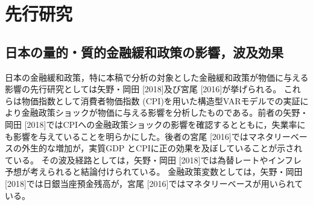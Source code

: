 \documentclass[12pt]{jarticle}
\begin{document}
{%






\section{先行研究}

\subsection{日本の量的・質的金融緩和政策の影響，波及効果}

日本の金融緩和政策，特に本稿で分析の対象とした金融緩和政策が物価に与える影響の先行研究としては矢野・岡田 [2018]及び宮尾 [2016]が挙げられる。
これらは物価指数として消費者物価指数 (CPI)を用いた構造型VARモデルでの実証により金融政策ショックが物価に与える影響を分析したものである。前者の矢野・岡田 [2018]ではCPIへの金融政策ショックの影響を確認するとともに，失業率にも影響を与えていることを明らかにした。後者の宮尾 [2016]ではマネタリーベースの外生的な増加が，実質GDP とCPIに正の効果を及ぼしていることが示されている。
その波及経路としては，矢野・岡田 [2018]では為替レートやインフレ予想が考えられると結論付けられている。
金融政策変数としては，矢野・岡田 [2018]では日銀当座預金残高が，宮尾 [2016]ではマネタリーベースが用いられている。

}
\end{document}
